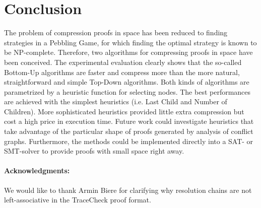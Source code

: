 \section{Conclusion}
\label{sec:conclusion}

The problem of compression proofs in space has been reduced to finding strategies in a Pebbling Game, for which finding the optimal strategy is known to be NP-complete.
Therefore, two algorithms for compressing proofs in space have been conceived. The experimental evaluation clearly shows that the so-called Bottom-Up algorithms are faster and compress more than the more natural, straightforward and simple Top-Down algorithms. Both kinds of algorithms are parametrized by a heuristic function for selecting nodes. The best performances are achieved with the simplest heuristics (i.e. Last Child and Number of Children). More sophisticated heuristics provided little extra compression but cost a high price in execution time. Future work could investigate heuristics that take advantage of the particular shape of proofs generated by analysis of conflict graphs.
Furthermore, the methods could be implemented directly into a SAT- or SMT-solver to provide proofs with small space right away.

\vspace{-5pt}
\paragraph{Acknowledgments:} We would like to thank Armin Biere for clarifying why resolution chains are not left-associative in the TraceCheck proof format.

\vspace{-5pt}

